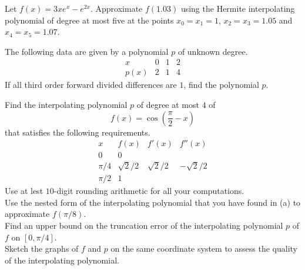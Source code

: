 \begin{question}
Let $f(x) = 3x e^x - e^{2x}$.  Approximate $f(1.03)$ using the Hermite
interpolating polynomial of degree at most five at the points
$x_0 = x_1 = 1$, $x_2 = x_3 = 1.05$ and $x_4 = x_5 = 1.07$.
\label{intAQ11}
\end{question}

\begin{question}
The following data are given by a polynomial $p$ of unknown degree.
\[
\begin{array}{c|c|c|c}
 x & 0 & 1 & 2 \\
\hline
 p(x) & 2 & 1 & 4
\end{array}
\]
If all third order forward divided differences are $1$, find the
polynomial $p$.
\label{intAQ12}
\end{question}

\begin{question}
 Find the interpolating polynomial $p$ of degree at most $4$ of
\[
f(x) = \cos\left(\frac{\pi}{2}-x\right)
\]
that satisfies the following requirements.
\[
\begin{array}{c|c|c|c}
x & f(x) & f'(x) & f''(x) \\
\hline
0 & 0 & & \\
\pi/4 & \sqrt{2}/2 & \sqrt{2}/2 & - \sqrt{2}/2 \\
\pi/2 & 1 &  & 
\end{array}
\]
Use at lest $10$-digit rounding arithmetic for all your computations.\\
 Use the nested form of the interpolating polynomial that you
have found in (a) to approximate $f(\pi/8)$.\\
 Find an upper bound on the truncation error of the
interpolating polynomial $p$ of $f$ on $[0,\pi/4]$.\\
 Sketch the graphs of $f$ and $p$ on the same coordinate
system to assess the quality of the interpolating polynomial.
\label{intAQ13}
\end{question}


